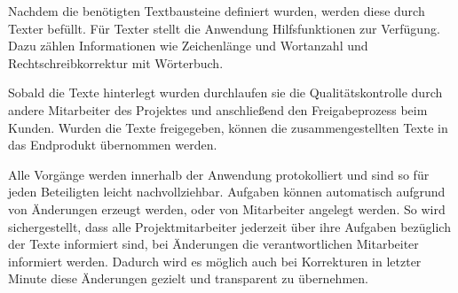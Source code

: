 Nachdem die benötigten Textbausteine definiert wurden, werden diese durch Texter befüllt. Für Texter stellt die Anwendung Hilfsfunktionen zur Verfügung. Dazu zählen Informationen wie Zeichenlänge und Wortanzahl und Rechtschreibkorrektur mit Wörterbuch.

Sobald die Texte hinterlegt wurden durchlaufen sie die Qualitätskontrolle durch andere Mitarbeiter des Projektes und anschließend den Freigabeprozess beim Kunden. Wurden die Texte freigegeben, können die zusammengestellten Texte in das Endprodukt übernommen werden. 

Alle Vorgänge werden innerhalb der Anwendung protokolliert und sind so für jeden Beteiligten leicht nachvollziehbar. Aufgaben können automatisch aufgrund von Änderungen erzeugt werden, oder von Mitarbeiter angelegt werden. So wird sichergestellt, dass alle Projektmitarbeiter jederzeit über ihre Aufgaben bezüglich der Texte informiert sind, bei Änderungen die verantwortlichen Mitarbeiter informiert werden. Dadurch wird es möglich auch bei Korrekturen in letzter Minute diese Änderungen gezielt und transparent zu übernehmen.

\pagebreak